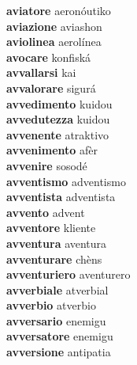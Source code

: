 \textbf{aviatore } aeronóutiko \\
\textbf{aviazione } aviashon \\
\textbf{aviolinea } aerolínea \\
\textbf{avocare } konfiská \\
\textbf{avvallarsi } kai \\
\textbf{avvalorare } sigurá \\
\textbf{avvedimento } kuidou \\
\textbf{avvedutezza } kuidou \\
\textbf{avvenente } atraktivo \\
\textbf{avvenimento } afèr \\
\textbf{avvenire } sosodé \\
\textbf{avventismo } adventismo \\
\textbf{avventista } adventista \\
\textbf{avvento } advent \\
\textbf{avventore } kliente \\
\textbf{avventura } aventura \\
\textbf{avventurare } chèns \\
\textbf{avventuriero } aventurero \\
\textbf{avverbiale } atverbial \\
\textbf{avverbio } atverbio \\
\textbf{avversario } enemigu \\
\textbf{avversatore } enemigu \\
\textbf{avversione } antipatia \\
